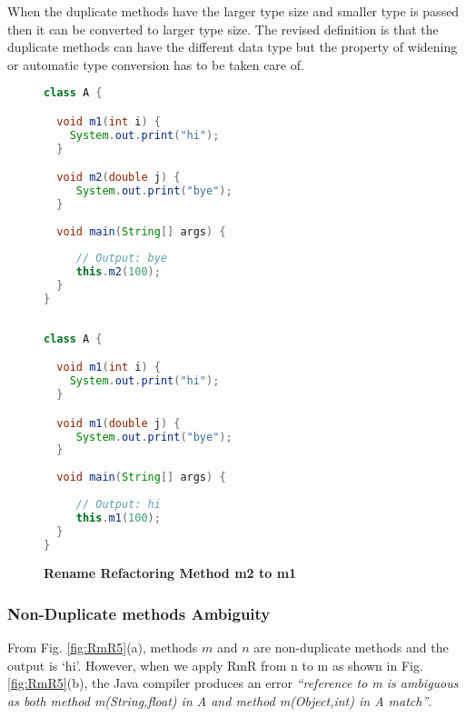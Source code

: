 When the duplicate methods have the larger type size and smaller type is passed then it can be converted to larger type size. The revised definition is that the duplicate methods can have the different data type but the property of widening or automatic type conversion has to be taken care of.

\begin{figure}[th]
\centering
\begin{minipage}[t]{0.47\linewidth}
\begin{lstlisting}[language=java, basicstyle=\scriptsize\ttfamily,frame=single]
class A {

  void m1(int i) {	
    System.out.print("hi");
  }

  void m2(double j) {	
     System.out.print("bye");
  }	
  
  void main(String[] args) {
	
     // Output: bye
     this.m2(100); 
  }
}
 
\end{lstlisting}
\end{minipage}
\hfill
\begin{minipage}[t]{0.47\linewidth}
\begin{lstlisting}[language=java, basicstyle=\scriptsize\ttfamily,frame=single]
class A {

  void m1(int i) {	
    System.out.print("hi");
  }

  void m1(double j) {	
     System.out.print("bye");
  }	
  
  void main(String[] args) {
	
     // Output: hi
     this.m1(100); 
  }
}

\end{lstlisting}
\end{minipage}
\caption{\textbf{Rename Refactoring Method m2 to m1}}
\label{fig:RmR4}
\end{figure}

\subsubsection {Non-Duplicate methods Ambiguity} 
From Fig. \ref{fig:RmR5}(a), methods $m$ and $n$ are non-duplicate methods and the output is `hi'. However, when we apply RmR from n to m as shown in Fig. \ref{fig:RmR5}(b), the Java compiler produces an error \textsl{``reference to m is ambiguous as both method m(String,float) in A and method m(Object,int) in A match''}. 

